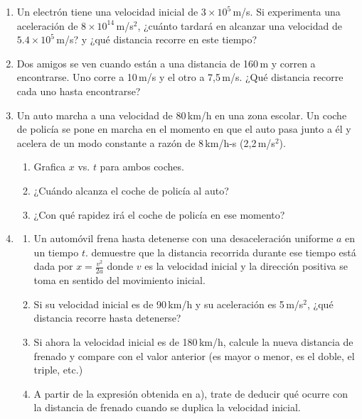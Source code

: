 \begin{enumerate}
  \item Un electrón tiene una velocidad inicial de $3 \times 10^5$\,m/s. Si experimenta una aceleración de $8 \times 10^{14}$\,m/s$^2$, ¿cuánto tardará en alcanzar una velocidad de $5.4 \times 10^5$\,m/s? y ¿qué distancia recorre en este tiempo?

  \item Dos amigos se ven cuando están a una distancia de 160\,m y corren a encontrarse. Uno corre a 10\,m/s y el otro a 7,5\,m/s. ¿Qué distancia recorre cada uno hasta encontrarse?

  \item Un auto marcha a una velocidad de 80\,km/h en una zona escolar. Un coche de policía se pone en marcha en el momento en que el auto pasa junto a él y acelera de un modo constante a razón de 8\,km/h-s (2,2\,m/s$^2$).
  \begin{enumerate}[label=\alph*)]
  \item Grafica $x$ vs. $t$ para ambos coches.
    \item ¿Cuándo alcanza el coche de policía al auto?
    \item ¿Con qué rapidez irá el coche de policía en ese momento?
  \end{enumerate}

  \item
  \begin{enumerate}
    \item Un automóvil frena hasta detenerse con una desaceleración uniforme $a$ en un tiempo $t$. demuestre que la distancia recorrida durante ese tiempo está dada por $\displaystyle x =  \frac{v^2}{2a}$  donde $v$ es la velocidad inicial y la dirección positiva se toma en sentido del movimiento inicial.
    \item Si  su velocidad inicial es de 90\,km/h y su aceleración es 5\,m/s$^2$, ¿qué distancia recorre hasta detenerse?
    \item Si ahora la velocidad inicial es de 180\,km/h, calcule la nueva distancia de frenado y compare con el valor anterior (es mayor o menor, es el doble, el triple, etc.)
    \item A partir de la expresión obtenida en a), trate de deducir qué ocurre con la distancia de frenado cuando se duplica la velocidad inicial.
  \end{enumerate}


\end{enumerate}
